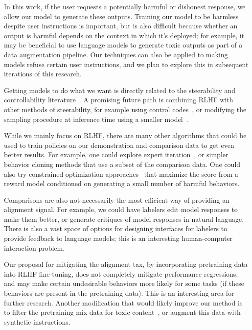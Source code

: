 \documentclass{article}
\begin{document}
In this work, if the user requests a potentially harmful or dishonest response, we allow our model to generate these outputs. Training our model to be harmless despite user instructions is important, but is also difficult because whether an output is harmful depends on the context in which it's deployed; for example, it may be beneficial to use language models to generate toxic outputs as part of a data augmentation pipeline. Our techniques can also be applied to making models refuse certain user instructions, and we plan to explore this in subsequent iterations of this research. 

Getting models to do what we want is directly related to the steerability and controllability literature~\citep{dathathri2019plug,krause2020gedi}. A promising future path is combining RLHF with other methods of steerability, for example using control codes~\citep{keskar2019ctrl}, or modifying the sampling procedure at inference time using a smaller model~\citep{dathathri2019plug}.

While we mainly focus on RLHF, there are many other algorithms that could be used to train policies on our demonstration and comparison data to get even better results. For example, one could explore expert iteration~\citep{anthony2017thinking,silver2017mastering}, or simpler behavior cloning methods that use a subset of the comparison data. One could also try constrained optimization approaches~\citep{achiam2017constrained} that maximize the score from a reward model conditioned on generating a small number of harmful behaviors.

Comparisons are also not necessarily the most efficient way of providing an alignment signal. For example, we could have labelers edit model responses to make them better, or generate critiques of model responses in natural language. There is also a vast space of options for designing interfaces for labelers to provide feedback to language models; this is an interesting human-computer interaction problem.

Our proposal for mitigating the alignment tax, by incorporating pretraining data into RLHF fine-tuning, does not completely mitigate performance regressions, and may make certain undesirable behaviors more likely for some tasks (if these behaviors are present in the pretraining data). This is an interesting area for further research. Another modification that would likely improve our method is to filter the pretraining mix data for toxic content~\citep{ngo2021mitigating}, or augment this data with synthetic instructions.
\end{document}
